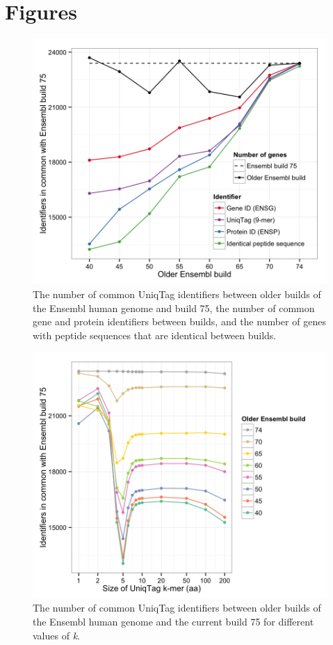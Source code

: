 \documentclass[10pt]{article}
\begin{document}
\newpage

\section{Figures}\label{figures}

\begin{figure}[htbp]
\centering
\includegraphics{figure/ensembl.png}
\caption{The number of common UniqTag identifiers between older builds
of the Ensembl human genome and build 75, the number of common gene and
protein identifiers between builds, and the number of genes with peptide
sequences that are identical between builds.}
\end{figure}

\begin{figure}[htbp]
\centering
\includegraphics{figure/k.png}
\caption{The number of common UniqTag identifiers between older builds
of the Ensembl human genome and the current build 75 for different
values of \emph{k}.}
\end{figure}
\end{document}
